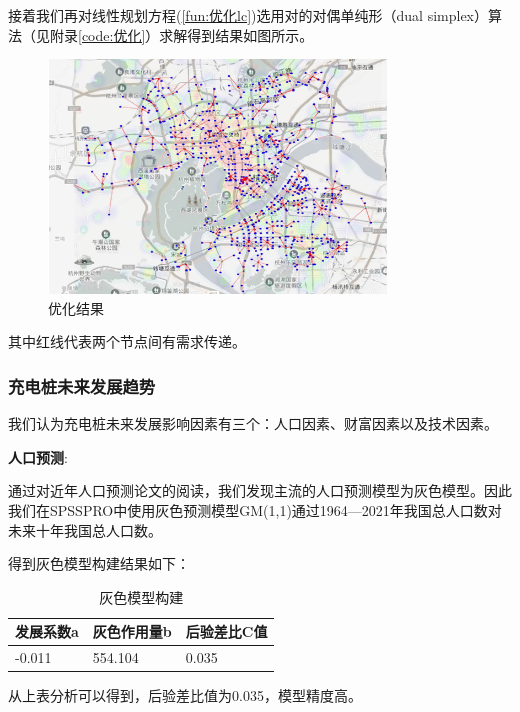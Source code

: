\documentclass[12pt, a4paper, oneside]{ctexart}
\begin{document}
接着我们再对线性规划方程(\ref{fun:优化lc})选用对的对偶单纯形（dual simplex）算法（见附录\ref{code:优化}）求解得到结果如图所示。

\begin{figure}[H]
  \centering
  \includegraphics[width=0.8\textwidth]{pic/带背景选址.png}
  \caption{优化结果}
  \label{fig:优化结果}
\end{figure}

其中红线代表两个节点间有需求传递。

\subsubsection{充电桩未来发展趋势}
我们认为充电桩未来发展影响因素有三个：人口因素、财富因素以及技术因素。

\textbf{人口预测}:

通过对近年人口预测论文的阅读，我们发现主流的人口预测模型为灰色模型。因此我们在SPSSPRO中使用灰色预测模型GM(1,1)通过1964---2021年我国总人口数对未来十年我国总人口数。

得到灰色模型构建结果如下：

\begin{table}[H]
  \centering
  \begin{tabularx}{0.9\textwidth}{XXX}
  \toprule
  发展系数a & 灰色作用量b & 后验差比C值 \\
  \midrule
  -0.011 & 554.104 & 0.035 \\
  \bottomrule
  \end{tabularx}
  \caption{灰色模型构建}
  \label{tab:grey}
\end{table}

从上表分析可以得到，后验差比值为0.035，模型精度高。
\end{document}

